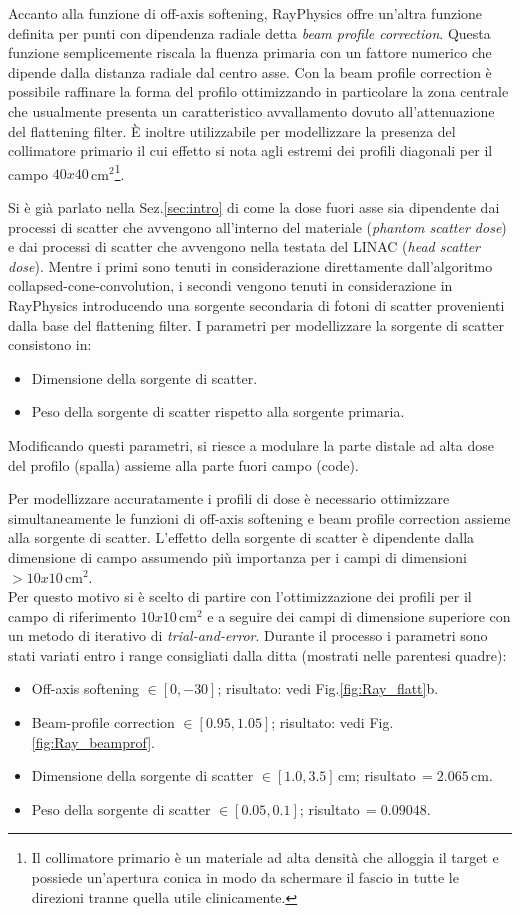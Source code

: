 Accanto alla funzione di off-axis softening, RayPhysics offre un'altra funzione definita per punti con dipendenza radiale detta \textit{beam profile correction}. Questa funzione semplicemente riscala la fluenza primaria con un fattore numerico che dipende dalla distanza radiale dal centro asse. Con la beam profile correction è possibile raffinare la forma del profilo ottimizzando in particolare la zona centrale che usualmente presenta un caratteristico avvallamento dovuto all'attenuazione del flattening filter. \`E inoltre utilizzabile per modellizzare la presenza del collimatore primario il cui effetto si nota agli estremi dei profili diagonali per il campo $40x40\,$cm$^2$\footnote{Il collimatore primario è un materiale ad alta densità che alloggia il target e possiede un'apertura conica in modo da schermare il fascio in tutte le direzioni tranne quella utile clinicamente.}.

Si è già parlato nella Sez.\ref{sec:intro} di come la dose fuori asse sia dipendente dai processi di scatter che avvengono all'interno del materiale (\textit{phantom scatter dose}) e dai processi di scatter che avvengono nella testata del LINAC (\textit{head scatter dose}). Mentre i primi sono tenuti in considerazione direttamente dall'algoritmo collapsed-cone-convolution, i secondi vengono tenuti in considerazione in RayPhysics introducendo una sorgente secondaria di fotoni di scatter provenienti dalla base del flattening filter. I parametri per modellizzare la sorgente di scatter consistono in:
\begin{itemize}
\item Dimensione della sorgente di scatter.
\item Peso della sorgente di scatter rispetto alla sorgente primaria.
\end{itemize}
Modificando questi parametri, si riesce a modulare la parte distale ad alta dose del profilo (spalla) assieme alla parte fuori campo (code).

Per modellizzare accuratamente i profili di dose è necessario ottimizzare simultaneamente le funzioni di off-axis softening e beam profile correction assieme alla sorgente di scatter. L'effetto della sorgente di scatter è dipendente dalla dimensione di campo assumendo più importanza per i campi di dimensioni $> 10x10\,$cm$^2$.\\
Per questo motivo si è scelto di partire con l'ottimizzazione dei profili per il campo di riferimento $10x10\,$cm$^2$ e a seguire dei campi di dimensione superiore con un metodo di iterativo di \textit{trial-and-error}. Durante il processo i parametri sono stati variati entro i range consigliati dalla ditta (mostrati nelle parentesi quadre):
\begin{itemize}
\item Off-axis softening $\in[0,-30]$; risultato: vedi Fig.\ref{fig:Ray_flatt}b.
\item Beam-profile correction $\in[0.95,1.05]$; risultato: vedi Fig.\ref{fig:Ray_beamprof}.
\item Dimensione della sorgente di scatter $\in[1.0,3.5]\,$cm; risultato$\,=2.065\,$cm.
\item Peso della sorgente di scatter $\in[0.05,0.1]$; risultato$\,=0.09048$.
\end{itemize}

